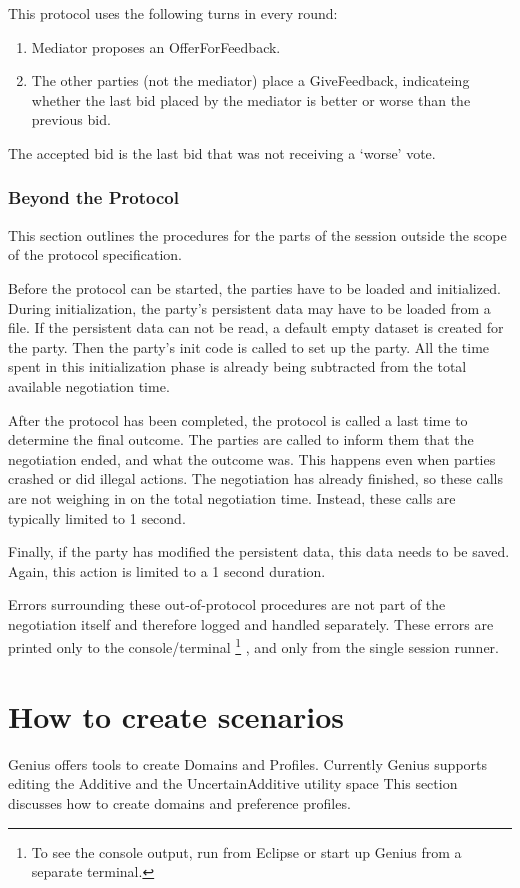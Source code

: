 \documentclass[]{llncs}
\newcommand\Genius{{\sc Genius}}
\begin{document}
This protocol uses the following turns in every round:
\begin{enumerate}
\item Mediator proposes an OfferForFeedback. 
\item The other parties (not the mediator) place a GiveFeedback,  indicateing whether the last bid placed by the mediator is better or worse than the previous bid.
\end{enumerate}

The accepted bid is the last bid that was not receiving a `worse' vote. 

\subsubsection{Beyond the Protocol}
This section outlines the procedures for the parts of the session outside the scope of the protocol specification.

Before the protocol can be started, the parties have to be loaded and initialized. During initialization, the party's persistent data may have to be loaded from a file. If the persistent data can not be read, a default empty dataset is created for the party. Then the party's init code is called to set up the party. All the time spent in this initialization phase is already being subtracted from the total available negotiation time.

After the protocol has been completed, the protocol is called a last time to determine the final outcome. 
The parties are called to inform them that the negotiation ended, and what the outcome was. This happens even when parties crashed or did illegal actions. The negotiation has already finished, so these calls are not weighing in on the total negotiation time. Instead, these calls are typically limited to 1 second. 

Finally, if the party has modified the persistent data, this data needs to be saved. Again, this action is limited to a 1 second duration.

Errors surrounding these out-of-protocol procedures are not part of the negotiation itself and therefore logged and handled separately. These errors are printed only to the console/terminal \footnote{To see the console output, run from Eclipse or start up {\Genius} from a separate terminal. }
, and only from the single session runner.



\section{How to create scenarios}\label{sec:scenariocreation}
{\Genius} offers tools to create Domains and Profiles. Currently {\Genius} supports editing the Additive and the UncertainAdditive utility space
 This section discusses how to create domains and preference profiles.
\end{document}
